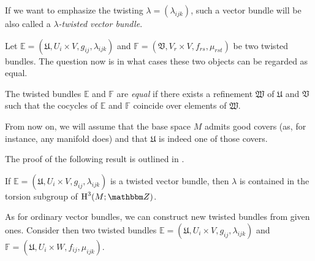 If we want to emphasize the twisting $\lambda =(\lambda_{ijk})$, such a vector bundle will be also called a \emph{$\lambda$-twisted vector bundle}.

Let $\mathbb{E}=(\mathfrak{U},U_i\times V,g_{ij},\lambda_{ijk})$ and $\mathbb{F}=(\mathfrak{V},V_r\times V,f_{rs},\mu_{rst})$ be two twisted bundles. The question now is in what cases these two objects can be regarded as equal.

\begin{defi}
The twisted bundles $\mathbb{E}$ and $\mathbb{F}$ are \emph{equal} if there exists a refinement $\mathfrak{W}$ of $\mathfrak{U}$ and $\mathfrak{V}$ such that the cocycles of $\mathbb{E}$ and $\mathbb{F}$ coincide over elements of $\mathfrak{W}$.
\end{defi}

\begin{obs}
From now on, we will assume that the base space $M$ admits good covers (as, for instance, any manifold does) and that $\mathfrak{U}$ is indeed one of those covers.
\end{obs}

The proof of the following result is outlined in \cite{karoubi:twisted_vector}.

\begin{proposition}\label{tvb_torsion}
If $\mathbb{E}=(\mathfrak{U},U_i\times V,g_{ij},\lambda_{ijk})$ is a twisted vector bundle, then $\lambda$ is contained in the torsion subgroup of $\opnm{H}^3(M;\ent )$.
\end{proposition}

As for ordinary vector bundles, we can construct new twisted bundles from given ones. Consider then two twisted bundles $\mathbb{E}=(\mathfrak{U},U_i\times V,g_{ij},\lambda_{ijk})$ and $\mathbb{F}=(\mathfrak{U},U_i\times W,f_{ij},\mu_{ijk})$.

